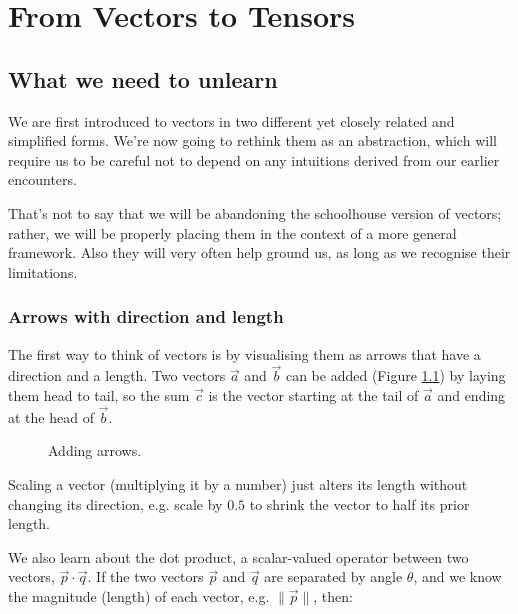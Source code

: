 \chapter{From Vectors to Tensors} \label{ch:vectors}

\section{What we need to unlearn}

We are first introduced to vectors in two different yet closely related and simplified forms. We're now going to rethink them as an abstraction, which will require us to be careful not to depend on any intuitions derived from our earlier encounters.

That's not to say that we will be abandoning the schoolhouse version of vectors; rather, we will be properly placing them in the context of a more general framework. Also they will very often help ground us, as long as we recognise their limitations.

\subsection{Arrows with direction and length}

The first way to think of vectors is by visualising them as arrows that have a direction and a length. Two vectors $\vec{a}$ and $\vec{b}$ can be added (Figure \ref{fig:vector-addition}) by laying them head to tail, so the sum $\vec{c}$ is the vector starting at the tail of $\vec{a}$ and ending at the head of $\vec{b}$.

\begin{figure}[h]
    \centering
    \caption{Adding arrows.} \label{fig:vector-addition}
\end{figure}

Scaling a vector (multiplying it by a number) just alters its length without changing its direction, e.g. scale by $0.5$ to shrink the vector to half its prior length.

We also learn about the dot product, a scalar-valued operator between two vectors, $\vec{p}\cdot\vec{q}$. If the two vectors $\vec{p}$ and $\vec{q}$ are separated by angle $\theta$, and we know the magnitude (length) of each vector, e.g. $\|\vec{p}\|$, then:

